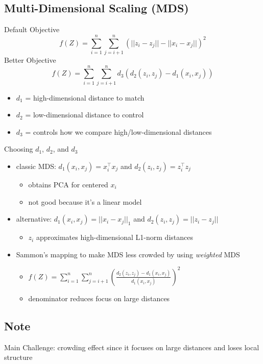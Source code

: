 \documentclass[10pt,landscape,a4paper]{article}
\begin{document}
\begin{multicols*}{5}
\section{Multi-Dimensional Scaling (MDS)}
Default Objective
\begin{dmath*}
   f(Z) = \sum_{i=1}^{n} \sum_{j=i+1}^{n} (||z_i - z_j|| - ||x_i - x_j||)^2
\end{dmath*}
Better Objective
\begin{dmath*}
    f(Z) = \sum\limits_{i=1}^{n}\sum\limits_{j=i+1}^{n} d_3(d_2(z_i, z_j) - d_1(x_i, x_j))
\end{dmath*}
\begin{itemize}
    \item \(d_1\) = high-dimensional distance to match
    \item \(d_2\) = low-dimensional distance to control
    \item \(d_3\) = controls how we compare high/low-dimensional distances
\end{itemize}
Choosing \(d_1\), \(d_2\), and \(d_3\)
\begin{itemize}
    \item classic MDS: \(d_1(x_i, x_j) = x_i^\intercal x_j\) and \(d_2(z_i, z_j) = z_i^\intercal z_j\)
    \begin{itemize}
        \item obtains PCA for centered \(x_i\)
        \item not good because it's a linear model
    \end{itemize}
    \item alternative: \(d_1(x_i, x_j) = ||x_i - x_j||_1\) and \(d_2(z_i, z_j) = ||z_i - z_j||\)
    \begin{itemize}
        \item \(z_i\) approximates high-dimensional L1-norm distances
    \end{itemize}
    \item Sammon's mapping to make MDS less crowded by using \emph{weighted} MDS
    \begin{itemize}
        \item \(f(Z) = \sum_{i=1}^{n} \sum_{j=i+1}^{n} (\frac{d_2(z_i,z_j) - d_1(x_i,x_j)}{d_1(x_i,x_j)})^2\)
        \item denominator reduces focus on large distances
    \end{itemize}
\end{itemize}

\subsection{Note}
Main Challenge: crowding effect since it focuses on large distances and loses local structure


\end{multicols*}
\end{document}
